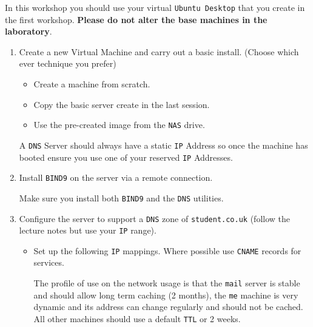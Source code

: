 \documentclass[11pt]{article}
\begin{document}

\begin{tcolorbox}[title={\textbf{NOTE:}}]
    In this workshop you should use your virtual \texttt{Ubuntu Desktop} that you create in the first workshop. \textbf{Please do not alter the base machines in the laboratory}.
\end{tcolorbox}

\begin{enumerate}
    \item Create a new Virtual Machine and carry out a basic install. (Choose which ever technique you prefer)
        \begin{itemize}
            \item Create a machine from scratch.
            \item Copy the basic server create in the last session.
            \item Use the pre-created image from the \texttt{NAS} drive.
        \end{itemize}
        \begin{tcolorbox}[title={\textbf{NOTE:}}]
            A \texttt{DNS} Server should always have a static \texttt{IP} Address so once the machine has booted ensure you use one of your reserved \texttt{IP} Addresses.
        \end{tcolorbox}
    \item Install \texttt{BIND9} on the server via a remote connection. 
        \begin{tcolorbox}[title={\textbf{NOTE:}}]
            Make sure you install both \texttt{BIND9} and the \texttt{DNS} utilities. 
        \end{tcolorbox}
    \item Configure the server to support a \texttt{DNS} zone of \texttt{student.co.uk} (follow the lecture notes but use your \texttt{IP} range).
        \begin{itemize}
            \item Set up the following \texttt{IP} mappings. Where possible use \texttt{CNAME} records for services.
                \begin{tcolorbox}[title={\textbf{NOTE:}}]
                    The profile of use on the network usage is that the \texttt{mail} server is stable and should allow long term caching (2 months), the \texttt{me} machine is very dynamic and its address can change regularly and should not be cached. All other machines should use a default \texttt{TTL} or 2 weeks.
                \end{tcolorbox}

\end{itemize}
\end{enumerate}
\end{document}
